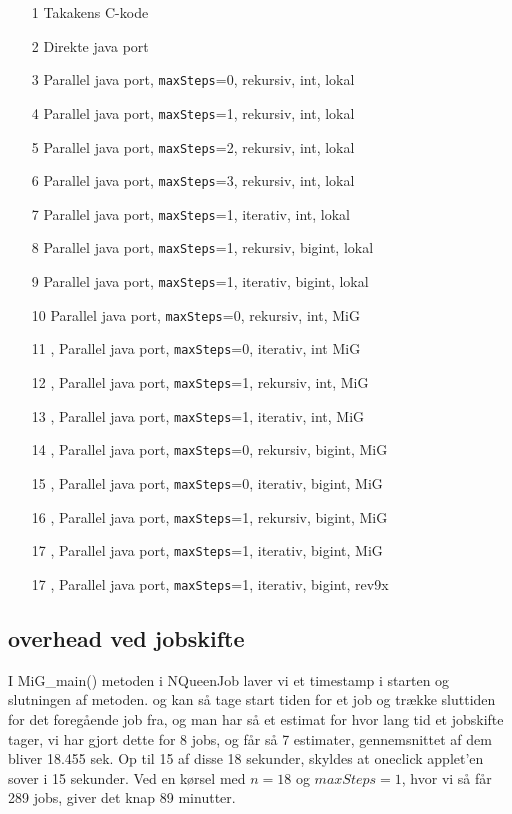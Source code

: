 \begin{itemize}
\item[1] Takakens C-kode
\item[2] Direkte java port
\item[3] Parallel java port, \texttt{maxSteps}=0, rekursiv, int, lokal
\item[4] Parallel java port, \texttt{maxSteps}=1, rekursiv, int, lokal
\item[5] Parallel java port, \texttt{maxSteps}=2, rekursiv, int, lokal
\item[6] Parallel java port, \texttt{maxSteps}=3, rekursiv, int, lokal
\item[7] Parallel java port, \texttt{maxSteps}=1, iterativ, int, lokal
\item[8] Parallel java port, \texttt{maxSteps}=1, rekursiv, bigint, lokal
\item[9] Parallel java port, \texttt{maxSteps}=1, iterativ, bigint, lokal
\item[10] Parallel java port, \texttt{maxSteps}=0, rekursiv, int, MiG
\item[11], Parallel java port, \texttt{maxSteps}=0, iterativ, int MiG
\item[12], Parallel java port, \texttt{maxSteps}=1, rekursiv, int, MiG
\item[13], Parallel java port, \texttt{maxSteps}=1, iterativ, int, MiG
\item[14], Parallel java port, \texttt{maxSteps}=0, rekursiv, bigint, MiG
\item[15], Parallel java port, \texttt{maxSteps}=0, iterativ, bigint, MiG
\item[16], Parallel java port, \texttt{maxSteps}=1, rekursiv, bigint, MiG
\item[17], Parallel java port, \texttt{maxSteps}=1, iterativ, bigint, MiG
\item[17], Parallel java port, \texttt{maxSteps}=1, iterativ, bigint, rev9x 
\end{itemize}

\subsection{overhead ved jobskifte}

I MiG\_main() metoden i NQueenJob laver vi et timestamp i starten og slutningen af metoden. 
og kan så tage start tiden for et job og trække sluttiden for det foregående job
fra, og man har så et estimat for hvor lang tid et jobskifte tager, vi har gjort
dette for 8 jobs, og får så 7 estimater, gennemsnittet af dem bliver 18.455 sek. 
Op til 15 af disse 18 sekunder, skyldes at oneclick applet'en sover i 15 sekunder. 
Ved en kørsel med $n=18$ og $maxSteps=1$, hvor vi så får 289 jobs, giver det
knap 89 minutter. 


